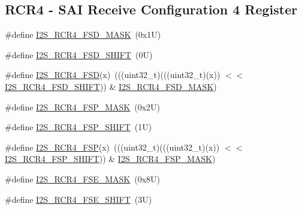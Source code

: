 \subsection*{R\+C\+R4 -\/ S\+AI Receive Configuration 4 Register}
\begin{DoxyCompactItemize}
\item 
\#define \mbox{\hyperlink{group___i2_s___register___masks_ga73d35aef97f3e91b82beb86b19b0b04f}{I2\+S\+\_\+\+R\+C\+R4\+\_\+\+F\+S\+D\+\_\+\+M\+A\+SK}}~(0x1\+U)
\item 
\#define \mbox{\hyperlink{group___i2_s___register___masks_gab4d17b5f07f9c4c8ba9e25ff5352d47c}{I2\+S\+\_\+\+R\+C\+R4\+\_\+\+F\+S\+D\+\_\+\+S\+H\+I\+FT}}~(0\+U)
\item 
\#define \mbox{\hyperlink{group___i2_s___register___masks_ga7a11a82efd12c21f47c47bee9b78a05b}{I2\+S\+\_\+\+R\+C\+R4\+\_\+\+F\+SD}}(x)~(((uint32\+\_\+t)(((uint32\+\_\+t)(x)) $<$$<$ \mbox{\hyperlink{group___i2_s___register___masks_gab4d17b5f07f9c4c8ba9e25ff5352d47c}{I2\+S\+\_\+\+R\+C\+R4\+\_\+\+F\+S\+D\+\_\+\+S\+H\+I\+FT}})) \& \mbox{\hyperlink{group___i2_s___register___masks_ga73d35aef97f3e91b82beb86b19b0b04f}{I2\+S\+\_\+\+R\+C\+R4\+\_\+\+F\+S\+D\+\_\+\+M\+A\+SK}})
\item 
\#define \mbox{\hyperlink{group___i2_s___register___masks_gadebeb77b006bfdfa2a247a1004b3ed26}{I2\+S\+\_\+\+R\+C\+R4\+\_\+\+F\+S\+P\+\_\+\+M\+A\+SK}}~(0x2\+U)
\item 
\#define \mbox{\hyperlink{group___i2_s___register___masks_gac009d35af5a1ed6a1201d23dbcfcea72}{I2\+S\+\_\+\+R\+C\+R4\+\_\+\+F\+S\+P\+\_\+\+S\+H\+I\+FT}}~(1\+U)
\item 
\#define \mbox{\hyperlink{group___i2_s___register___masks_gaf30f3088f3fc06a88cb66be264c1f1fd}{I2\+S\+\_\+\+R\+C\+R4\+\_\+\+F\+SP}}(x)~(((uint32\+\_\+t)(((uint32\+\_\+t)(x)) $<$$<$ \mbox{\hyperlink{group___i2_s___register___masks_gac009d35af5a1ed6a1201d23dbcfcea72}{I2\+S\+\_\+\+R\+C\+R4\+\_\+\+F\+S\+P\+\_\+\+S\+H\+I\+FT}})) \& \mbox{\hyperlink{group___i2_s___register___masks_gadebeb77b006bfdfa2a247a1004b3ed26}{I2\+S\+\_\+\+R\+C\+R4\+\_\+\+F\+S\+P\+\_\+\+M\+A\+SK}})
\item 
\#define \mbox{\hyperlink{group___i2_s___register___masks_ga9c6885d55f2de2dcd4649b15582dbd63}{I2\+S\+\_\+\+R\+C\+R4\+\_\+\+F\+S\+E\+\_\+\+M\+A\+SK}}~(0x8\+U)
\item 
\#define \mbox{\hyperlink{group___i2_s___register___masks_ga37d794e272f05da947af5073c3340a6e}{I2\+S\+\_\+\+R\+C\+R4\+\_\+\+F\+S\+E\+\_\+\+S\+H\+I\+FT}}~(3\+U)
\item 

\end{DoxyCompactItemize}
